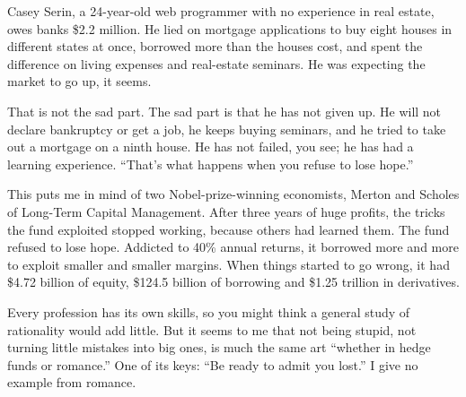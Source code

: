 
Casey Serin, a 24-year-old web programmer with no experience in real estate, owes banks \$2.2 million. He lied on mortgage applications to buy eight houses in different states at once, borrowed more than the houses cost, and spent the difference on living expenses and real-estate seminars. He was expecting the market to go up, it seems. 

That is not the sad part. The sad part is that he has not given up. He will not declare bankruptcy or get a job, he keeps buying seminars, and he tried to take out a mortgage on a ninth house. He has not failed, you see; he has had a learning experience. ``That's what happens when you refuse to lose hope.''

This puts me in mind of two Nobel-prize-winning economists, Merton and Scholes of Long-Term Capital Management.  After three years of huge profits, the tricks the fund exploited stopped working, because others had learned them. The fund refused to lose hope. Addicted to 40\% annual returns, it borrowed more and more to exploit smaller and smaller margins. When things started to go wrong, it had \$4.72 billion of equity, \$124.5 billion of borrowing and \$1.25 trillion in derivatives. 

Every profession has its own skills, so you might think a general study of rationality would add little. But it seems to me that not being stupid, not turning little mistakes into big ones, is much the same art ``whether in hedge funds or romance.'' One of its keys: ``Be ready to admit you lost.'' I give no example from romance. 
